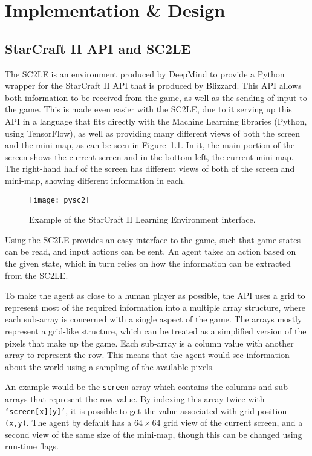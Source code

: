\chapter{Implementation \& Design}%
\label{implem}

\section{StarCraft II API and SC2LE}

The SC2LE is an environment produced by DeepMind to provide a Python wrapper for
the StarCraft II API that is produced by Blizzard. This API allows both
information to be received from the game, as well as the sending of input to the
game. This is made even easier with the SC2LE, due to it serving up this API in
a language that fits directly with the Machine Learning libraries (Python, using
TensorFlow), as well as providing many different views of both the screen and
the mini-map, as can be seen in Figure~\ref{fig:sc2le}. In it, the main portion
of the screen shows the current screen and in the bottom left, the current
mini-map. The right-hand half of the screen has different views of both of the
screen and mini-map, showing different information in each.

\begin{figure}[h]
    \centering
    \texttt{[image: pysc2]}
    \caption{Example of the StarCraft II Learning Environment interface.}%
    \label{fig:sc2le}
\end{figure}

Using the SC2LE provides an easy interface to the game, such that game states
can be read, and input actions can be sent. An agent takes an action based on
the given state, which in turn relies on how the information can be extracted
from the SC2LE\@.

To make the agent as close to a human player as possible, the API uses a grid to
represent most of the required information into a multiple array structure, where
each sub-array is concerned with a single aspect of the game. The arrays mostly
represent a grid-like structure, which can be treated as a simplified version of
the pixels that make up the game. Each sub-array is a column value with another
array to represent the row. This means that the agent would see information
about the world using a sampling of the available pixels.

An example would be the \texttt{screen} array which contains the columns and
sub-arrays that represent the row value. By indexing this array twice with
\texttt{`screen[x][y]'}, it is possible to get the value associated with grid
position \texttt{(x,y)}. The agent by default has a $64 \times 64$ grid view of
the current screen, and a second view of the same size of the mini-map, though
this can be changed using run-time flags.

